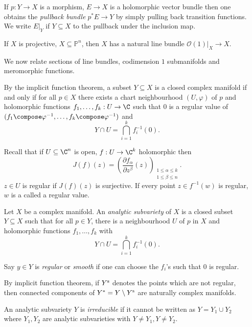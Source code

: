 \documentclass[a4paper]{article}
\renewcommand{\P}{\mathbb P} %
\begin{document}
\begin{eg}
  If \(p: Y \to X\) is a morphism, \(E \to X\) is a holomorphic vector bundle then one obtains the \emph{pullback bundle} \(p^*E \to Y\) by simply pulling back transition functions. We write \(E|_Y\) if \(Y \subseteq X\) to the pullback under the inclusion map.

  If \(X\) is projective, \(X \subseteq \P^n\), then \(X\) has a natural line bundle \(\mathcal O(1)|_X \to X\).
\end{eg}

We now relate sections of line bundles, codimension \(1\) submanifolds and meromorphic functions.

By the implicit function theorem, a subset \(Y \subseteq X\) is a closed complex manifold if and only if for all \(p \in X\) there exists a chart neighbourhood \((U, \varphi)\) of \(p\) and holomorphic functions \(f_1, \dots, f_k: U \to \C\) such that \(0\) is a regular value of \((f_1 \compose \varphi^{-1}, \dots, f_k \compose \varphi^{-1})\) and
\[
  Y \cap U = \bigcap_{i = 1}^k f_i^{-1}(0).
\]

Recall that if \(U \subseteq \C^n\) is open, \(f: U \to \C^k\) holomorphic then
\[
  J(f)(z) = \left( \frac{\partial f_\alpha}{\partial z^\beta}(z) \right)_{\substack{1 \leq \alpha \leq k \\ 1 \leq \beta \leq n}}.
\]
\(z \in U\) is regular if \(J(f)(z)\) is surjective. If every point \(z \in f^{-1}(w)\) is regular, \(w\) is a called a regular value.

\begin{definition}
  Let \(X\) be a complex manifold. An \emph{analytic subvariety} of \(X\) is a closed subset \(Y \subseteq X\) such that for all \(p \in Y\), there is a neighbourhood \(U\) of \(p\) in \(X\) and holomorphic functions \(f_1, \dots, f_k\) with
  \[
    Y \cap U = \bigcap_{i = 1}^k f_i^{-1}(0).
  \]

  Say \(y \in Y\) is \emph{regular} or \emph{smooth} if one can choose the \(f_i\)'s such that \(0\) is regular.
\end{definition}

By implicit function theorem, if \(Y^{\text s}\) denotes the points which are not regular, then connected components of \(Y^* = Y \setminus Y^{\text s}\) are naturally complex manifolds.

\begin{definition}[irreducible]
  An analytic subvariety \(Y\) is \emph{irreducible} if it cannot be written as \(Y = Y_1 \cup Y_2\) where \(Y_1, Y_2\) are analytic subvarieties with \(Y \neq Y_1, Y \neq Y_2\).
\end{definition}
\end{document}
